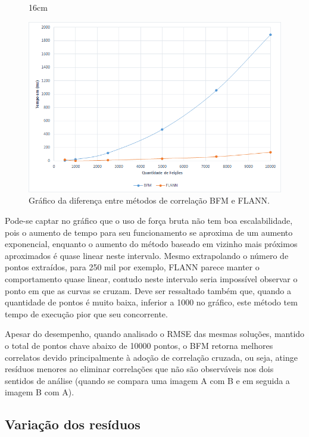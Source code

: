 \begin{figure}[]{16cm}
  \caption{Gráfico da diferença entre métodos de correlação BFM e FLANN.} \label{GRAPH}
  \includegraphics[width=\hsize]{figuras/Grafico.png}
\end{figure}

Pode-se captar no gráfico que o uso de força bruta não tem boa escalabilidade, pois o aumento de tempo para seu funcionamento se aproxima de um aumento exponencial, enquanto o aumento do método baseado em vizinho mais próximos aproximados é quase linear neste intervalo. Mesmo extrapolando o número de pontos extraídos, para 250 mil por exemplo, FLANN parece manter o comportamento quase linear, contudo neste intervalo seria impossível observar o ponto em que as curvas se cruzam. Deve ser ressaltado também que, quando a quantidade de pontos é muito baixa, inferior a 1000 no gráfico, este método tem tempo de execução pior que seu concorrente.

Apesar do desempenho, quando analisado o RMSE das mesmas soluções, mantido o total de pontos chave abaixo de 10000 pontos, o BFM retorna melhores correlatos devido principalmente à adoção de correlação cruzada, ou seja, atinge resíduos menores ao eliminar correlações que não são observáveis nos dois sentidos de análise (quando se compara uma imagem A com B e em seguida a imagem B com A). 

\subsection{Variação dos resíduos}


